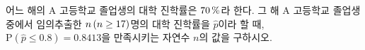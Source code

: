 어느 해의 A 고등학교 졸업생의 대학 진학률은 $70\mkern3mu \%$라 한다. 그 해 A 고등학교 졸업생 중에서 임의추출한 $n\mkern3mu (n\ge 17)$명의 대학 진학률을 $\hat{p}$이라 할 때, $\mathrm{P}(\hat{p}\le 0.8)=0.8413$을 만족시키는 자연수 $n$의 값을 구하시오. 
